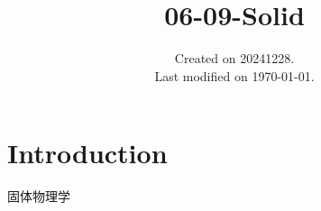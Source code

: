 \documentclass[UTF8]{../06-Physics}
\begin{document}
\title{06-09-Solid}
\date{Created on 20241228.\\   Last modified on \today.}
\maketitle
\tableofcontents





\chapter{Introduction}

固体物理学

\end{document}
